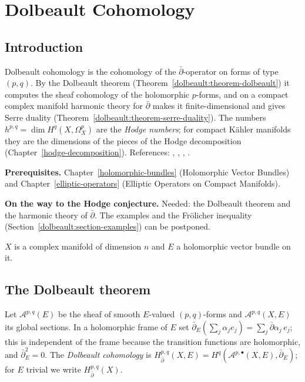 \chapter{Dolbeault Cohomology}\label{dolbeault}

\section{Introduction}\label{dolbeault:section-introduction}

Dolbeault cohomology is the cohomology of the $\bar\partial$-operator on forms of type $(p,q)$. By the Dolbeault theorem
(Theorem~\ref{dolbeault:theorem-dolbeault}) it computes the sheaf cohomology of the holomorphic $p$-forms, and on a compact complex
manifold harmonic theory for $\bar\partial$ makes it finite-dimensional and gives Serre duality
(Theorem~\ref{dolbeault:theorem-serre-duality}). The numbers $h^{p,q} = \dim H^q(X, \Omega^p_X)$ are the \emph{Hodge numbers}; for
compact K\"ahler manifolds they are the dimensions of the pieces of the Hodge decomposition (Chapter~\ref{hodge-decomposition}).
References: \cite[Chapter 0]{griffiths-harris}, \cite[Chapter 4]{voisin-hodge-1}, \cite[Chapters 2--4]{huybrechts-complex},
\cite{wells-differential-analysis}.

\noindent\textbf{Prerequisites.} Chapter~\ref{holomorphic-bundles} (Holomorphic Vector Bundles) and Chapter~\ref{elliptic-operators}
(Elliptic Operators on Compact Manifolds).

\noindent\textbf{On the way to the Hodge conjecture.} Needed: the Dolbeault theorem and the harmonic theory of $\bar\partial$. The examples and the Fr\"olicher inequality (Section~\ref{dolbeault:section-examples}) can be
postponed.

$X$ is a complex manifold of dimension $n$ and $E$ a holomorphic vector bundle on it.

\section{The Dolbeault theorem}\label{dolbeault:section-dolbeault-theorem}

\begin{definition}\label{dolbeault:definition-dolbeault}
Let $\mathcal{A}^{p,q}(E)$ be the sheaf of smooth $E$-valued $(p,q)$-forms and $\mathcal{A}^{p,q}(X, E)$ its global sections. In a holomorphic frame of $E$ set $\bar\partial_E(\sum_j\alpha_j e_j) = \sum_j\bar\partial\alpha_j\,e_j$;
this is independent of the frame because the transition functions are holomorphic, and $\bar\partial_E^2 = 0$. The \emph{Dolbeault cohomology} is
$H^{p,q}_{\bar\partial}(X, E) = H^q(\mathcal{A}^{p,\bullet}(X, E), \bar\partial_E)$; for $E$ trivial we write $H^{p,q}_{\bar\partial}(X)$.
\end{definition}

